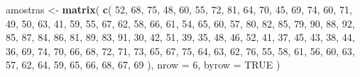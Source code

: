 \documentclass[
]{book}
\newenvironment{Shaded}{\begin{snugshade}}{\end{snugshade}}
\newcommand{\AttributeTok}[1]{\textcolor[rgb]{0.13,0.29,0.53}{#1}}
\newcommand{\ConstantTok}[1]{\textcolor[rgb]{0.56,0.35,0.01}{#1}}
\newcommand{\DecValTok}[1]{\textcolor[rgb]{0.00,0.00,0.81}{#1}}
\newcommand{\FunctionTok}[1]{\textcolor[rgb]{0.13,0.29,0.53}{\textbf{#1}}}
\newcommand{\NormalTok}[1]{#1}
\newcommand{\OtherTok}[1]{\textcolor[rgb]{0.56,0.35,0.01}{#1}}
\begin{document}
\begin{Shaded}
\begin{Highlighting}[]
\NormalTok{amostras }\OtherTok{\textless{}{-}} \FunctionTok{matrix}\NormalTok{(}
  \FunctionTok{c}\NormalTok{(}
    \DecValTok{52}\NormalTok{, }\DecValTok{68}\NormalTok{, }\DecValTok{75}\NormalTok{, }\DecValTok{48}\NormalTok{, }\DecValTok{60}\NormalTok{, }\DecValTok{55}\NormalTok{, }\DecValTok{72}\NormalTok{, }\DecValTok{81}\NormalTok{, }\DecValTok{64}\NormalTok{, }\DecValTok{70}\NormalTok{, }\DecValTok{45}\NormalTok{, }\DecValTok{69}\NormalTok{, }\DecValTok{74}\NormalTok{, }\DecValTok{60}\NormalTok{, }\DecValTok{71}\NormalTok{,}
    \DecValTok{49}\NormalTok{, }\DecValTok{50}\NormalTok{, }\DecValTok{63}\NormalTok{, }\DecValTok{41}\NormalTok{, }\DecValTok{59}\NormalTok{, }\DecValTok{55}\NormalTok{, }\DecValTok{67}\NormalTok{, }\DecValTok{62}\NormalTok{, }\DecValTok{58}\NormalTok{, }\DecValTok{66}\NormalTok{, }\DecValTok{61}\NormalTok{, }\DecValTok{54}\NormalTok{, }\DecValTok{65}\NormalTok{, }\DecValTok{60}\NormalTok{, }\DecValTok{57}\NormalTok{,}
    \DecValTok{80}\NormalTok{, }\DecValTok{82}\NormalTok{, }\DecValTok{85}\NormalTok{, }\DecValTok{79}\NormalTok{, }\DecValTok{90}\NormalTok{, }\DecValTok{88}\NormalTok{, }\DecValTok{92}\NormalTok{, }\DecValTok{85}\NormalTok{, }\DecValTok{87}\NormalTok{, }\DecValTok{84}\NormalTok{, }\DecValTok{86}\NormalTok{, }\DecValTok{81}\NormalTok{, }\DecValTok{89}\NormalTok{, }\DecValTok{83}\NormalTok{, }\DecValTok{91}\NormalTok{,}
    \DecValTok{30}\NormalTok{, }\DecValTok{42}\NormalTok{, }\DecValTok{51}\NormalTok{, }\DecValTok{39}\NormalTok{, }\DecValTok{35}\NormalTok{, }\DecValTok{48}\NormalTok{, }\DecValTok{46}\NormalTok{, }\DecValTok{52}\NormalTok{, }\DecValTok{41}\NormalTok{, }\DecValTok{37}\NormalTok{, }\DecValTok{45}\NormalTok{, }\DecValTok{43}\NormalTok{, }\DecValTok{38}\NormalTok{, }\DecValTok{44}\NormalTok{, }\DecValTok{36}\NormalTok{,}
    \DecValTok{69}\NormalTok{, }\DecValTok{74}\NormalTok{, }\DecValTok{70}\NormalTok{, }\DecValTok{66}\NormalTok{, }\DecValTok{68}\NormalTok{, }\DecValTok{72}\NormalTok{, }\DecValTok{71}\NormalTok{, }\DecValTok{73}\NormalTok{, }\DecValTok{65}\NormalTok{, }\DecValTok{67}\NormalTok{, }\DecValTok{75}\NormalTok{, }\DecValTok{64}\NormalTok{, }\DecValTok{63}\NormalTok{, }\DecValTok{62}\NormalTok{, }\DecValTok{76}\NormalTok{,}
    \DecValTok{55}\NormalTok{, }\DecValTok{58}\NormalTok{, }\DecValTok{61}\NormalTok{, }\DecValTok{56}\NormalTok{, }\DecValTok{60}\NormalTok{, }\DecValTok{63}\NormalTok{, }\DecValTok{57}\NormalTok{, }\DecValTok{62}\NormalTok{, }\DecValTok{64}\NormalTok{, }\DecValTok{59}\NormalTok{, }\DecValTok{65}\NormalTok{, }\DecValTok{66}\NormalTok{, }\DecValTok{68}\NormalTok{, }\DecValTok{67}\NormalTok{, }\DecValTok{69}
\NormalTok{  ),}
  \AttributeTok{nrow =} \DecValTok{6}\NormalTok{,}
  \AttributeTok{byrow =} \ConstantTok{TRUE}
\NormalTok{)}
\end{Highlighting}
\end{Shaded}
\end{document}
